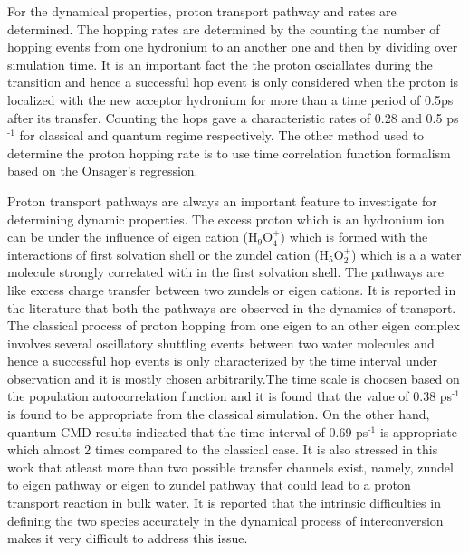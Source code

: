 \documentclass{article}
\begin{document}
For the dynamical properties, proton transport pathway and rates are determined. The hopping rates are determined by the counting the number of hopping events from one hydronium to an another one and then by dividing over simulation time. It is an important fact the the proton osciallates during the transition and hence a successful hop event is only considered when the proton is localized with the new acceptor hydronium for more than a time period of 0.5ps after its transfer. Counting the hops gave a characteristic rates of 0.28 and 0.5 ps$^{\text{-1}}$ for classical and quantum regime respectively. The other method used to determine the proton hopping rate is to use time correlation function formalism based on the Onsager's regression.

Proton transport pathways are always an important feature to investigate for determining dynamic properties. The excess proton which is an hydronium ion can be under the influence of eigen cation (H$_{\text{9}}$O$_{\text{4}}^{\text{+}}$) which is formed with the interactions of first solvation shell or the zundel cation (H$_{\text{5}}$O$_{\text{2}}^{\text{+}}$) which is a a water molecule strongly correlated with in the first solvation shell. The pathways are like excess charge transfer between two zundels or eigen cations. It is reported in the literature that both the pathways are observed in the dynamics of transport. The classical process of proton hopping from one eigen to an other eigen complex involves several oscillatory shuttling events between two water molecules and hence a successful hop events is only characterized by the time interval under observation and it is mostly chosen arbitrarily.The time scale is choosen based on the population autocorrelation function and it is found that the value of 0.38 ps$^{\text{-1}}$ is found to be appropriate from the classical simulation. On the other hand, quantum CMD results indicated that the time interval of 0.69 ps$^{\text{-1}}$ is appropriate which almost 2 times compared to the classical case. It is also stressed in this work that atleast more than two possible transfer channels exist, namely, zundel to eigen pathway or eigen to zundel pathway that could lead to a proton transport reaction in bulk water. It is reported that the intrinsic difficulties in defining the two species accurately in the dynamical process of interconversion makes it very difficult to address this issue.
\end{document}
